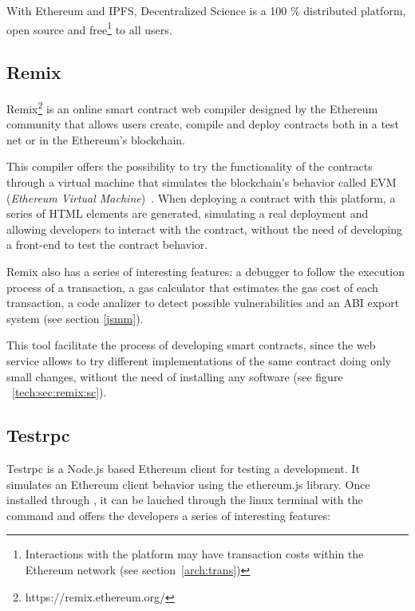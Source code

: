 With Ethereum and IPFS, Decentralized Science is a 100 \% distributed platform,
open source and free\footnote{Interactions with the platform may have
  transaction costs within the Ethereum network (see section~\ref{arch:trans})
  \nopagebreak} to all users.


\subsection{Remix}
\label{sec:remix}

Remix\footnote{https://remix.ethereum.org/} is an online smart
contract web compiler designed by the Ethereum community that allows users
create, compile and deploy contracts both in a test net or in the Ethereum's
blockchain.

This compiler offers the possibility to try the functionality of the contracts
through a virtual machine that simulates the blockchain's behavior called EVM
(\emph{Ethereum Virtual Machine})~\cite{hildenbrandt2017kevm}. When deploying a
contract with this platform, a series of HTML elements are generated, simulating
a real deployment and allowing developers to interact with the contract, without
the need of developing a front-end to test the contract behavior.

Remix also has a series of interesting features: a debugger to follow the
execution process of a transaction, a gas calculator that estimates the gas cost
of each transaction, a code analizer to detect possible vulnerabilities and an
ABI export system (see section \ref{jsmm}).

This tool facilitate the process of developing smart contracts, since the web
service allows to try different implementations of the same contract doing only
small changes, without the need of installing any software (see figure
~\ref{tech:sec:remix:sc}).

\subsection{Testrpc}
\label{testrpc}


Testrpc is a Node.js based Ethereum client for testing a development. It
simulates an Ethereum client behavior using the ethereum.js library. Once
installed through , it can be lauched through the linux terminal with the
command  and offers the developers a series of interesting
features:


